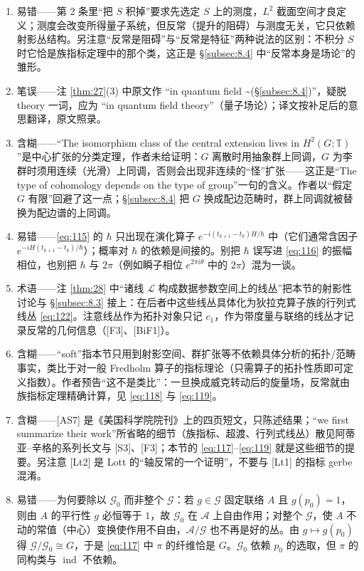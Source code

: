 \documentclass[11pt]{amsart}
\theoremstyle{definition}
\theoremstyle{remark}
\theoremstyle{plain}
\numberwithin{equation}{section}
\renewcommand{\:}{\colon}
\newcommand{\TT}{\mathbb T}
\DeclareMathOperator{\ind}{ind}
\newcommand{\evo}[2]{e^{-i(t_{#1}-t_{#2})H/\hbar}}
\newcommand{\sA}{\mathcal{A}}
\newcommand{\sG}{\mathscr{G}}
\newcommand{\sL}{\mathcal{L}}
\begin{document}
\begin{enumerate}[leftmargin=2.2em,itemsep=2pt,topsep=2pt]
  \item 易错——第 2 条里“把 $S$ 积掉”要求先选定 $S$ 上的测度，$L^2$ 截面空间才良定义；测度会改变所得量子系统，但反常（提升的阻碍）与测度无关，它只依赖射影丛结构。另注意“反常是阻碍”与“反常是特征”两种说法的区别：不积分 $S$ 时它恰是族指标定理中的那个类，这正是 §\ref{subsec:8.4} 中“反常本身是场论”的雏形。
  \item 笔误——注 \ref{thm:27}(3) 中原文作 “in quantum field \textasciitilde{}(\S\ref{subsec:8.4})”，疑脱 theory 一词，应为 “in quantum field theory”（量子场论）；译文按补足后的意思翻译，原文照录。
  \item 含糊——“The isomorphism class of the central extension lives in $H^2(G;\TT)$”是中心扩张的分类定理，作者未给证明：$G$ 离散时用抽象群上同调，$G$ 为李群时须用连续（光滑）上同调，否则会出现非连续的“怪”扩张——这正是“The type of cohomology depends on the type of group”一句的含义。作者以“假定 $G$ 有限”回避了这一点；§\ref{subsec:8.4} 把 $G$ 换成配边范畴时，群上同调就被替换为配边谱的上同调。
  \item 易错——\eqref{eq:115} 的 $\hbar$ 只出现在演化算子 $\evo{k+1}k$ 中（它们通常含因子 $e^{-iH(t_{k+1}-t_k)/\hbar}$）；概率对 $\hbar$ 的依赖是间接的。别把 $\hbar$ 误写进 \eqref{eq:116} 的振幅相位，也别把 $\hbar$ 与 $2\pi$（例如瞬子相位 $e^{2\pi i\theta}$ 中的 $2\pi$）混为一谈。
  \item 术语——注 \ref{thm:28} 中“诸线 $\sL$ 构成数据参数空间上的线丛”把本节的射影性讨论与 §\ref{subsec:8.3} 接上：在后者中这些线丛具体化为狄拉克算子族的行列式线丛 \eqref{eq:122}。注意线丛作为拓扑对象只记 $c_1$，作为带度量与联络的线丛才记录反常的几何信息（[F3]、[BiF1]）。
  \item 含糊——“soft”指本节只用到射影空间、群扩张等不依赖具体分析的拓扑/范畴事实，类比于对一般 Fredholm 算子的指标理论（只需算子的拓扑性质即可定义指数）。作者预告“这不是类比”：一旦换成威克转动后的旋量场，反常就由族指标定理精确计算，见 \eqref{eq:118} 与 \eqref{eq:119}。
  \item 含糊——[AS7] 是《美国科学院院刊》上的四页短文，只陈述结果；“we first summarize their work”所省略的细节（族指标、超渡、行列式线丛）散见阿蒂亚–辛格的系列长文与 [S3]、[F3]；本节的 \eqref{eq:117}–\eqref{eq:119} 就是这些细节的提要。另注意 [Lt2] 是 Lott 的“轴反常的一个证明”，不要与 [Lt1] 的指标 gerbe 混淆。
  \item 易错——为何要除以 $\sG_0$ 而非整个 $\sG$：若 $g\in\sG$ 固定联络 $A$ 且 $g(p_0)=1$，则由 $A$ 的平行性 $g$ 必恒等于 $1$，故 $\sG_0$ 在 $\sA$ 上自由作用；对整个 $\sG$，使 $A$ 不动的常值（中心）变换使作用不自由，$\sA/\sG$ 也不再是好的丛。由 $g\mapsto g(p_0)$ 得 $\sG/\sG_0\cong G$，于是 \eqref{eq:117} 中 $\pi $ 的纤维恰是 $G$。$\sG_0$ 依赖 $p_0$ 的选取，但 $\pi $ 的同构类与 $\ind$ 不依赖。

\end{enumerate}
\end{document}
